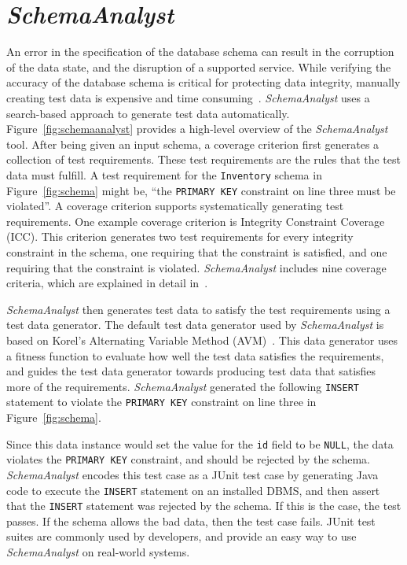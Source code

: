 \section{\textit{SchemaAnalyst}}\label{sec:technique}

An error in the specification of the database schema can result in the corruption of the data state, and the disruption
of a supported service.  While verifying the accuracy of the database schema is critical for protecting data integrity,
manually creating test data is expensive and time consuming~\cite{}. \textit{SchemaAnalyst} uses a search-based approach
to generate test data automatically. Figure~\ref{fig:schemaanalyst} provides a high-level overview of the
\textit{SchemaAnalyst} tool.  After being given an input schema, a coverage criterion first generates a collection of
test requirements. These test requirements are the rules that the test data must fulfill. A test requirement for the
\texttt{Inventory} schema in Figure~\ref{fig:schema} might be, ``the \texttt{PRIMARY KEY} constraint on line three must
be violated''. A coverage criterion supports systematically generating test requirements. One example coverage criterion
is Integrity Constraint Coverage (ICC). This criterion generates two test requirements for every integrity constraint in
the schema, one requiring that the constraint is satisfied, and one requiring that the constraint is violated.
\textit{SchemaAnalyst} includes nine coverage criteria, which are explained in detail in~\cite{mcminn2015effectiveness}.

\textit{SchemaAnalyst} then generates test data to satisfy the test requirements using a test data generator. The
default test data generator used by \textit{SchemaAnalyst} is based on Korel's Alternating Variable Method
(AVM)~\cite{Korel:AVM}.  This data generator uses a fitness function to evaluate how well the test data satisfies the
requirements, and guides the test data generator towards producing test data that satisfies more of the requirements.
\textit{SchemaAnalyst} generated the following \texttt{INSERT} statement to violate the \texttt{PRIMARY KEY} constraint
on line three in Figure~\ref{fig:schema}.



Since this data instance would set the value for the \texttt{id} field to be \texttt{NULL},
the data violates the \texttt{PRIMARY KEY} constraint, and should be rejected by the schema.
\textit{SchemaAnalyst} encodes this test case as a JUnit test case by generating Java code to execute
the \texttt{INSERT} statement on an installed DBMS, and then assert that the \texttt{INSERT} statement
was rejected by the schema. If this is the case, the test passes.  If the schema allows the bad data,
then the test case fails. JUnit test suites are commonly used by developers, and provide an easy way
to use \textit{SchemaAnalyst} on real-world systems.

